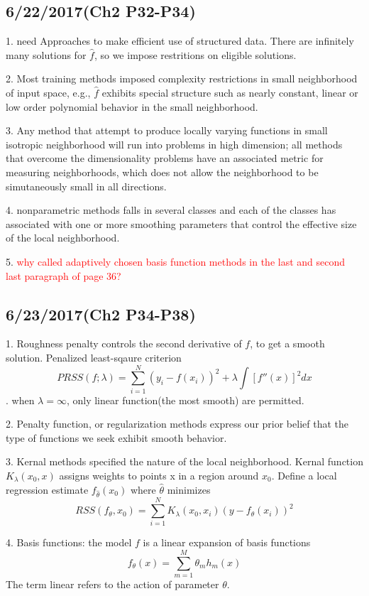 \documentclass[a4paper, 12pt]{article}
\begin{document}
\subsection*{6/22/2017(Ch2 P32-P34)}

1. need Approaches to make efficient use of structured data. There are infinitely many solutions for $\hat{f}$, so we impose restritions on eligible solutions.

2. Most training methods imposed complexity restrictions in small neighborhood of input space, e.g., $\hat{f}$ exhibits special structure such as nearly constant, linear or low order polynomial behavior in the small neighborhood.

3. Any method that attempt to produce locally varying functions in small isotropic neighborhood will run into problems in high dimension; all methods that overcome the dimensionality problems have an associated metric for measuring neighborhoods, which does not allow the neighborhood to be simutaneously small in all directions.

4. nonparametric methods falls in several classes and each of the classes has associated with one or more smoothing parameters that control the effective size of the local neighborhood.

5. \textcolor{red}{ 
why called adaptively chosen basis function methods in the last and second last paragraph of page 36?
}

\subsection*{6/23/2017(Ch2 P34-P38)}

1. Roughness penalty controls the second derivative of $f$, to get a smooth solution. Penalized least-sqaure criterion $$PRSS(f;\lambda)= \sum_{i=1}^N(y_i -f(x_i))^2 + \lambda\int[f''(x)]^2dx$$. when $\lambda=\infty$, only linear function(the most smooth) are permitted. 

2. Penalty function, or regularization methods express our prior belief that the type of functions we seek exhibit smooth behavior.

3. Kernal methods specified the nature of the local neighborhood. Kernal function $K_{\lambda}(x_0,x)$ assigns weights to points x in a region around $x_0$. Define a local regression estimate $f_{\hat{\theta}}(x_0)$ where $\hat{\theta}$ minimizes $$RSS(f_{\theta},x_0)=\sum_{i=1}^NK_{\lambda}(x_0,x_i)(y-f_{\theta}(x_i))^2$$

4. Basis functions: the model $f$ is a linear expansion of basis functions $$f_{\theta}(x)=\sum_{m=1}^M\theta_mh_m(x)$$
The term linear refers to the action of parameter $\theta$.
\end{document}
